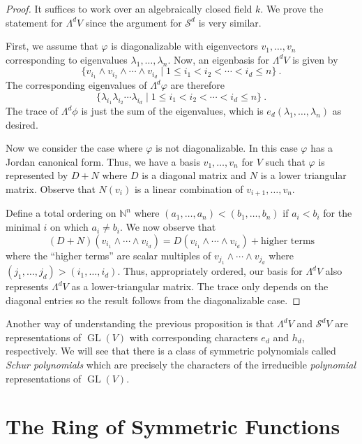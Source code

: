 \documentclass[12pt]{article}
\theoremstyle{plain}
\theoremstyle{definition}
\theoremstyle{remark}
\numberwithin{equation}{section}
\begin{document}
\begin{proof}
It suffices to work over an algebraically closed field $k$.
We prove the statement for $\Lambda^d V$ since the argument for
$\mathcal{S}^d$ is very similar. 

First, we assume that $\varphi$ is diagonalizable with eigenvectors
$v_1,\ldots, v_n$ corresponding to eigenvalues
$\lambda_1,\ldots,\lambda_n$.
Now, an eigenbasis for $\Lambda^d V$ is given by
\[
\{ v_{i_1}\wedge v_{i_2}\wedge \cdots \wedge v_{i_d} \mid
1 \le i_1 < i_2 < \cdots < i_d \le n \} \ .
\]
The corresponding eigenvalues of $\Lambda^d \varphi$ are therefore
\[
\{ \lambda_{i_1} \lambda_{i_2} \cdots \lambda_{i_d} \mid
1 \le i_1 < i_2 < \cdots < i_d \le n \} \ .
\]
The trace of $\Lambda^d \phi$ is just the sum of the eigenvalues, which
is $e_d(\lambda_1,\ldots,\lambda_n)$ as desired.

Now we consider the case where $\varphi$ is not diagonalizable.
In this case $\varphi$ has a Jordan canonical form.  Thus,
we have a basis $v_1,\ldots, v_n$ for $V$ such that $\varphi$ is
represented by $D+N$ where $D$ is a diagonal matrix and
$N$ is a lower triangular matrix.
Observe that $N(v_i)$ is a linear combination of $v_{i+1},\ldots, v_n$.

Define a total ordering on $\mathbb{N}^n$ where
$(a_1,\ldots,a_n) < (b_1,\ldots,b_n)$ if $a_i < b_i$ for the minimal $i$
on which $a_i \ne b_i$.
We now observe that
\[
(D+N)(v_{i_1}\wedge \cdots \wedge v_{i_d})
= D(v_{i_1}\wedge \cdots \wedge v_{i_d})
+ \textrm{higher terms} 
\]
where the ``higher terms'' are scalar multiples of
$v_{j_1}\wedge \cdots \wedge v_{j_d}$
where $(j_1,\ldots,j_d) > (i_1,\ldots,i_d)$.
Thus, appropriately ordered, our basis for $\Lambda^d V$
also represents $\Lambda^d V$ as a lower-triangular matrix.
The trace only depends on the diagonal entries so the result follows
from the diagonalizable case.
\end{proof}

Another way of understanding the previous proposition is that
$\Lambda^d V$ and $\mathcal{S}^d V$ are representations of
$\operatorname{GL}(V)$ with corresponding characters $e_d$ and
$h_d$, respectively.
We will see that there is a class of symmetric polynomials
called \emph{Schur polynomials} which are precisely the characters
of the irreducible \emph{polynomial} representations of
$\operatorname{GL}(V)$.


\section{The Ring of Symmetric Functions}
\end{document}

